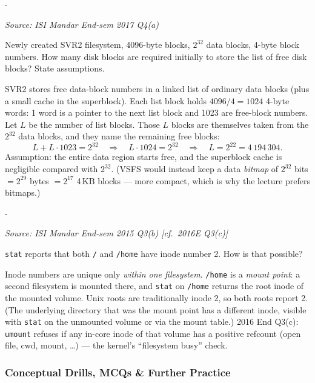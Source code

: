 \documentclass[11pt,a4paper]{article}
\makeatletter
\newcommand{\keepspace}[1]{\par\penalty-100\begingroup
  \setlength{\dimen@}{#1}\dimen@ii\pagegoal\advance\dimen@ii-\pagetotal
  \ifdim\dimen@>\dimen@ii\ifdim\dimen@ii>\z@\vfil\fi\break\fi\endgroup}
\newcounter{qn}[section]
\newenvironment{Qn}[4]{%
  \refstepcounter{qn}\keepspace{7\baselineskip}%
  \begin{tcolorbox}[qboxstyle, title={Q\thesection.\theqn\ \ [#1 \textbar\ #2]\ \ #4}]%
  {\footnotesize\color{g3}\textit{Source: #3}}\par\smallskip%
}{%
  \end{tcolorbox}%
}
\newenvironment{Sol}{%
  \begin{tcolorbox}[sboxstyle, title={Solution}]%
}{%
  \end{tcolorbox}\vspace{0.35em}%
}
\makeatother
\begin{document}
\begin{Qn}{Medium-Hard}{Lect 24}{ISI Mandar End-sem 2017 Q4(a)}{Free-block-list size on a huge volume}
Newly created SVR2 filesystem, 4096-byte blocks, $2^{32}$ data blocks,
4-byte block numbers. How many disk blocks are required initially to
store the list of free disk blocks? State assumptions.
\end{Qn}
\begin{Sol}
SVR2 stores free data-block numbers in a linked list of ordinary data
blocks (plus a small cache in the superblock). Each list block holds
$4096/4=1024$ 4-byte words: 1 word is a pointer to the next list
block and 1023 are free-block numbers. Let $L$ be the number of list
blocks. Those $L$ blocks are themselves taken from the $2^{32}$ data
blocks, and they name the remaining free blocks:
\[
  L + L\cdot 1023 = 2^{32} \quad\Rightarrow\quad L\cdot 1024 = 2^{32}
  \quad\Rightarrow\quad L = 2^{22} = 4\,194\,304.
\]
Assumption: the entire data region starts free, and the superblock
cache is negligible compared with $2^{32}$. (VSFS would instead keep
a data \emph{bitmap} of $2^{32}$ bits $= 2^{29}$ bytes
$=2^{17}$ 4\,KB blocks --- more compact, which is why the lecture
prefers bitmaps.)
\end{Sol}

\begin{Qn}{Medium}{Lect 23}{ISI Mandar End-sem 2015 Q3(b) [cf.\ 2016E Q3(c)]}{\texttt{/} and \texttt{/home} both show inode 2}
\texttt{stat} reports that both \texttt{/} and \texttt{/home} have
inode number 2. How is that possible?
\end{Qn}
\begin{Sol}
Inode numbers are unique only \emph{within one filesystem}.
\texttt{/home} is a \emph{mount point}: a second filesystem is mounted
there, and \texttt{stat} on \texttt{/home} returns the root inode of
the mounted volume. Unix roots are traditionally inode 2, so both
roots report 2. (The underlying directory that was the mount point
has a different inode, visible with \texttt{stat} on the unmounted
volume or via the mount table.) 2016 End Q3(c): \texttt{umount}
refuses if any in-core inode of that volume has a positive refcount
(open file, cwd, mount, \ldots) --- the kernel's ``filesystem busy''
check.
\end{Sol}

\subsubsection*{Conceptual Drills, MCQs \& Further Practice}
\end{document}
